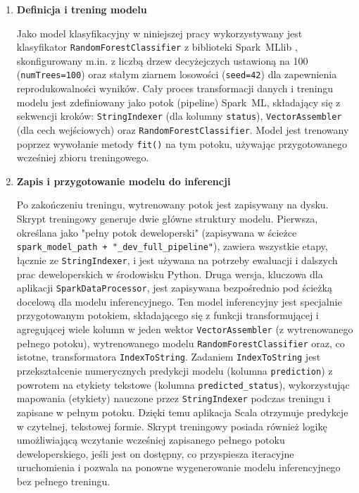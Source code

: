 \begin{enumerate}
    \item \textbf{Definicja i trening modelu}

Jako model klasyfikacyjny w niniejszej pracy wykorzystywany jest klasyfikator \texttt{RandomForestClassifier} z biblioteki \mbox{Spark MLlib} \cite{spark_mllib_reference}, skonfigurowany m.in. z liczbą drzew decyżejczych ustawioną na 100 (\texttt{numTrees=100}) oraz stałym ziarnem losowości (\texttt{seed=42}) dla zapewnienia reprodukowalności wyników. Cały proces transformacji danych i treningu modelu jest zdefiniowany jako potok (pipeline) \mbox{Spark ML}, składający się z sekwencji kroków: \texttt{StringIndexer} (dla kolumny \texttt{status}), \texttt{VectorAssembler} (dla cech wejściowych) oraz \texttt{RandomForestClassifier}. Model jest trenowany poprzez wywołanie metody \texttt{fit()} na tym potoku, używając przygotowanego wcześniej zbioru treningowego.

    \item \textbf{Zapis i przygotowanie modelu do inferencji}

Po zakończeniu treningu, wytrenowany potok jest zapisywany na dysku. Skrypt treningowy generuje dwie główne struktury modelu. Pierwsza, określana jako "pełny potok deweloperski" (zapisywana w ścieżce \texttt{spark\_model\_path + "\_dev\_full\_pipeline"}), zawiera wszystkie etapy, łącznie ze \texttt{StringIndexer}, i jest używana na potrzeby ewaluacji i dalszych prac deweloperskich w środowisku Python. Druga wersja, kluczowa dla aplikacji \texttt{SparkDataProcessor}, jest zapisywana bezpośrednio pod ścieżką docelową dla modelu inferencyjnego. Ten model inferencyjny jest specjalnie przygotowanym potokiem, składającego się z funkcji transformującej i agregującej wiele kolumn w jeden wektor \texttt{VectorAssembler} (z wytrenowanego pełnego potoku), wytrenowanego modelu \texttt{RandomForestClassifier} oraz, co istotne, transformatora \texttt{IndexToString}. Zadaniem \texttt{IndexToString} jest przekształcenie numerycznych predykcji modelu (kolumna \texttt{prediction}) z powrotem na etykiety tekstowe (kolumna \texttt{predicted\_status}), wykorzystując mapowania (etykiety) nauczone przez \texttt{StringIndexer} podczas treningu i zapisane w pełnym potoku. Dzięki temu aplikacja Scala otrzymuje predykcje w czytelnej, tekstowej formie. Skrypt treningowy posiada również logikę umożliwiającą wczytanie wcześniej zapisanego pełnego potoku deweloperskiego, jeśli jest on dostępny, co przyspiesza iteracyjne uruchomienia i pozwala na ponowne wygenerowanie modelu inferencyjnego bez pełnego treningu.


\end{enumerate}
